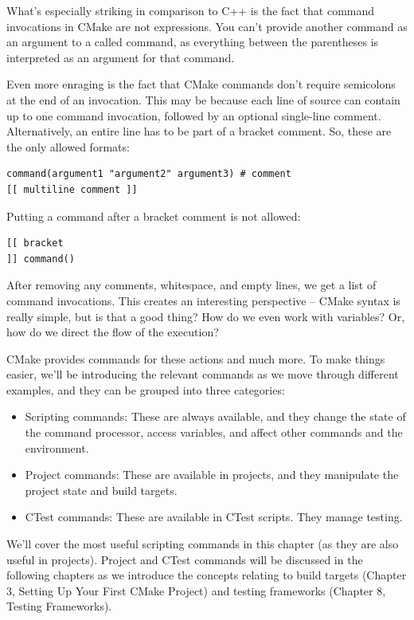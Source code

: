 What's especially striking in comparison to C++ is the fact that command invocations in CMake are not expressions. You can't provide another command as an argument to a called command, as everything between the parentheses is interpreted as an argument for that command.

Even more enraging is the fact that CMake commands don't require semicolons at the end of an invocation. This may be because each line of source can contain up to one command invocation, followed by an optional single-line comment. Alternatively, an entire line has to be part of a bracket comment. So, these are the only allowed formats:

\begin{lstlisting}[style=styleCMake]	
command(argument1 "argument2" argument3) # comment
[[ multiline comment ]]
\end{lstlisting}

Putting a command after a bracket comment is not allowed:

\begin{lstlisting}[style=styleCMake]	
[[ bracket
]] command()
\end{lstlisting}

After removing any comments, whitespace, and empty lines, we get a list of command invocations. This creates an interesting perspective – CMake syntax is really simple, but is that a good thing? How do we even work with variables? Or, how do we direct the flow of the execution?

CMake provides commands for these actions and much more. To make things easier, we'll be introducing the relevant commands as we move through different examples, and they can be grouped into three categories:

\begin{itemize}
\item 
Scripting commands: These are always available, and they change the state of the command processor, access variables, and affect other commands and the environment.

\item 
Project commands: These are available in projects, and they manipulate the project state and build targets.

\item 
CTest commands: These are available in CTest scripts. They manage testing.
\end{itemize}

We'll cover the most useful scripting commands in this chapter (as they are also useful in projects). Project and CTest commands will be discussed in the following chapters as we introduce the concepts relating to build targets (Chapter 3, Setting Up Your First CMake Project) and testing frameworks (Chapter 8, Testing Frameworks).

